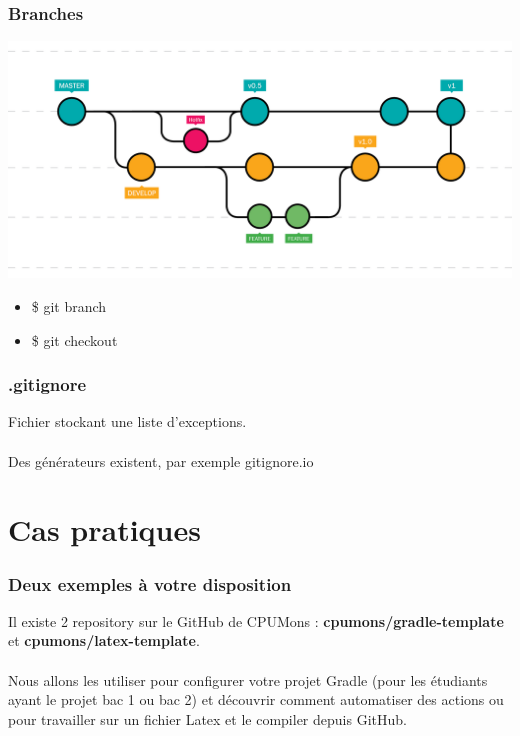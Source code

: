 \documentclass{beamer}
\begin{document}
\begin{frame}\frametitle{Branches}
    \begin{center}
        \includegraphics[scale=0.185]{branch.png}
    \end{center}
    \begin{itemize}
        \item \$ git branch
        \item \$ git checkout
    \end{itemize}
\end{frame}


\begin{frame}\frametitle{.gitignore}
    Fichier stockant une liste d'exceptions. \\~\\

    Des générateurs existent, par exemple gitignore.io
\end{frame}

\section{Cas pratiques} %

\begin{frame}\frametitle{Deux exemples à votre disposition}
    Il existe 2 repository sur le GitHub de CPUMons : \textbf{cpumons/gradle-template} et \textbf{cpumons/latex-template}. \\~\\

    Nous allons les utiliser pour configurer votre projet Gradle (pour les étudiants ayant le projet bac 1 ou bac 2) et découvrir comment automatiser des actions ou pour travailler sur un fichier Latex et le compiler depuis GitHub.
\end{frame}

\end{document}

